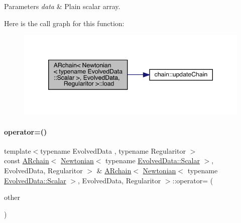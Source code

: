 \begin{DoxyParams}{Parameters}
{\em data} & Plain scalar array. \\
\hline
\end{DoxyParams}
Here is the call graph for this function\+:\nopagebreak
\begin{figure}[H]
\begin{center}
\leavevmode
\includegraphics[width=346pt]{class_a_rchain_3_01_newtonian_3_01typename_01_evolved_data_1_1_scalar_01_4_00_01_evolved_data_00_01_regularitor_01_4_a8e7bc5b32dbd7a0c9c3541f17fa54e28_cgraph}
\end{center}
\end{figure}
\mbox{\label{class_a_rchain_3_01_newtonian_3_01typename_01_evolved_data_1_1_scalar_01_4_00_01_evolved_data_00_01_regularitor_01_4_a577ecdf4e934627257a0824d59404831}} 
\paragraph{\texorpdfstring{operator=()}{operator=()}}
{\footnotesize\ttfamily template$<$typename Evolved\+Data , typename Regularitor $>$ \\
const \mbox{\hyperlink{class_a_rchain}{A\+Rchain}}$<$ \mbox{\hyperlink{class_newtonian}{Newtonian}}$<$ typename \mbox{\hyperlink{class_a_rchain_a707e42a79e4744424a34c9007e84ee07}{Evolved\+Data\+::\+Scalar}} $>$, Evolved\+Data, Regularitor $>$ \& \mbox{\hyperlink{class_a_rchain}{A\+Rchain}}$<$ \mbox{\hyperlink{class_newtonian}{Newtonian}}$<$ typename \mbox{\hyperlink{class_a_rchain_a707e42a79e4744424a34c9007e84ee07}{Evolved\+Data\+::\+Scalar}} $>$, Evolved\+Data, Regularitor $>$\+::operator= (\begin{DoxyParamCaption}\item[{const \mbox{\hyperlink{class_a_rchain}{A\+Rchain}}$<$ \mbox{\hyperlink{class_newtonian}{Newtonian}}$<$ typename \mbox{\hyperlink{class_a_rchain_a707e42a79e4744424a34c9007e84ee07}{Evolved\+Data\+::\+Scalar}} $>$, Evolved\+Data, Regularitor $>$ \&}]{other }\end{DoxyParamCaption})}



